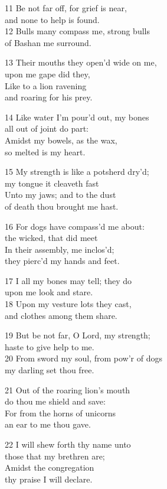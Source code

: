\begin{multicols}{3}
11 Be not far off, for grief is near,\\
and none to help is found.\\
12 Bulls many compass me, strong bulls\\
of Bashan me surround.

13 Their mouths they open’d wide on me,\\
upon me gape did they,\\
Like to a lion ravening\\
and roaring for his prey.

14 Like water I’m pour’d out, my bones\\
all out of joint do part:\\
Amidst my bowels, as the wax,\\
so melted is my heart.

15 My strength is like a potsherd dry’d;\\
my tongue it cleaveth fast\\
Unto my jaws; and to the dust\\
of death thou brought me hast.

16 For dogs have compass’d me about:\\
the wicked, that did meet\\
In their assembly, me inclos’d;\\
they pierc’d my hands and feet.

17 I all my bones may tell; they do\\
upon me look and stare.\\
18 Upon my vesture lots they cast,\\
and clothes among them share.

19 But be not far, O Lord, my strength;\\
haste to give help to me.\\
20 From sword my soul, from pow’r of dogs\\
my darling set thou free.

21 Out of the roaring lion’s mouth\\
do thou me shield and save:\\
For from the horns of unicorns\\
an ear to me thou gave.

22 I will shew forth thy name unto\\
those that my brethren are;\\
Amidst the congregation\\
thy praise I will declare.


\end{multicols}
